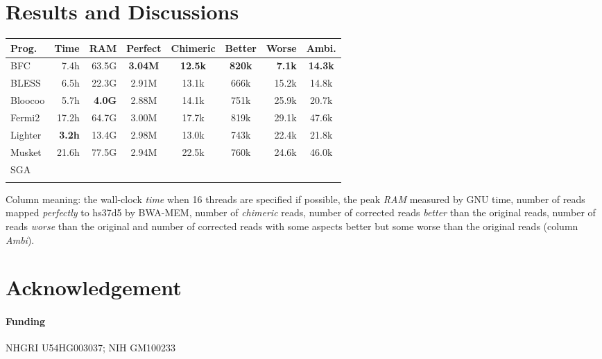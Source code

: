 \documentclass{bioinfo}
\begin{document}
\section{Results and Discussions}
\begin{table}[ht]
{\footnotesize
\begin{tabular}{lrrcccrc}
\toprule
Prog.     & Time & RAM   & Perfect & Chimeric & Better & Worse & Ambi. \\
\midrule
BFC       & 7.4h & 63.5G & {\bf 3.04M} & {\bf 12.5k} & {\bf 820k}   & {\bf 7.1k}  & {\bf 14.3k} \\
BLESS     & 6.5h & 22.3G & 2.91M   & 13.1k    & 666k   & 15.2k & 14.8k \\
Bloocoo   &5.7h&{\bf 4.0G}& 2.88M  & 14.1k    & 751k   & 25.9k & 20.7k \\
Fermi2    &17.2h & 64.7G & 3.00M   & 17.7k    & 819k   & 29.1k & 47.6k \\
Lighter   &{\bf 3.2h}& 13.4G&2.98M & 13.0k    & 743k   & 22.4k & 21.8k \\
Musket    &21.6h & 77.5G & 2.94M   & 22.5k    & 760k   & 24.6k & 46.0k \\
SGA       &\\
\botrule
\end{tabular}}{Column meaning: the wall-clock \emph{time} when 16 threads
are specified if possible, the peak \emph{RAM} measured by GNU time, number of
reads mapped \emph{perfectly} to hs37d5 by BWA-MEM, number of \emph{chimeric}
reads, number of corrected reads \emph{better} than the original reads, number
of reads \emph{worse} than the original and number of corrected reads with some
aspects better but some worse than the original reads (column \emph{Ambi}).}

\end{table}

\section*{Acknowledgement}
\paragraph{Funding\textcolon} NHGRI U54HG003037; NIH GM100233


\end{document}
